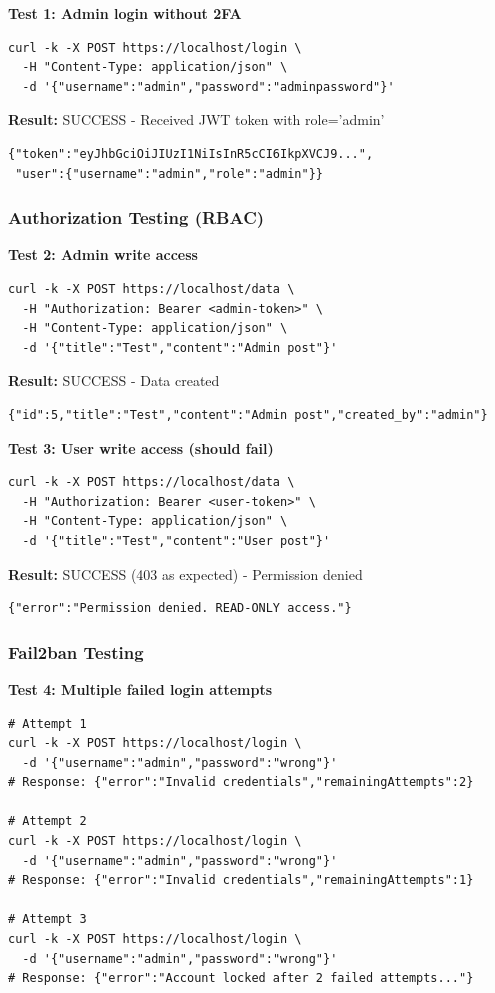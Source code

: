\textbf{Test 1: Admin login without 2FA}
\begin{verbatim}
curl -k -X POST https://localhost/login \
  -H "Content-Type: application/json" \
  -d '{"username":"admin","password":"adminpassword"}'
\end{verbatim}

\textbf{Result:} SUCCESS - Received JWT token with role='admin'
\begin{verbatim}
{"token":"eyJhbGciOiJIUzI1NiIsInR5cCI6IkpXVCJ9...",
 "user":{"username":"admin","role":"admin"}}
\end{verbatim}

\subsubsection{Authorization Testing (RBAC)}

\textbf{Test 2: Admin write access}
\begin{verbatim}
curl -k -X POST https://localhost/data \
  -H "Authorization: Bearer <admin-token>" \
  -H "Content-Type: application/json" \
  -d '{"title":"Test","content":"Admin post"}'
\end{verbatim}

\textbf{Result:} SUCCESS - Data created
\begin{verbatim}
{"id":5,"title":"Test","content":"Admin post","created_by":"admin"}
\end{verbatim}

\textbf{Test 3: User write access (should fail)}
\begin{verbatim}
curl -k -X POST https://localhost/data \
  -H "Authorization: Bearer <user-token>" \
  -H "Content-Type: application/json" \
  -d '{"title":"Test","content":"User post"}'
\end{verbatim}

\textbf{Result:} SUCCESS (403 as expected) - Permission denied
\begin{verbatim}
{"error":"Permission denied. READ-ONLY access."}
\end{verbatim}

\subsubsection{Fail2ban Testing}

\textbf{Test 4: Multiple failed login attempts}
\begin{verbatim}
# Attempt 1
curl -k -X POST https://localhost/login \
  -d '{"username":"admin","password":"wrong"}'
# Response: {"error":"Invalid credentials","remainingAttempts":2}

# Attempt 2
curl -k -X POST https://localhost/login \
  -d '{"username":"admin","password":"wrong"}'
# Response: {"error":"Invalid credentials","remainingAttempts":1}

# Attempt 3
curl -k -X POST https://localhost/login \
  -d '{"username":"admin","password":"wrong"}'
# Response: {"error":"Account locked after 2 failed attempts..."}
\end{verbatim}

